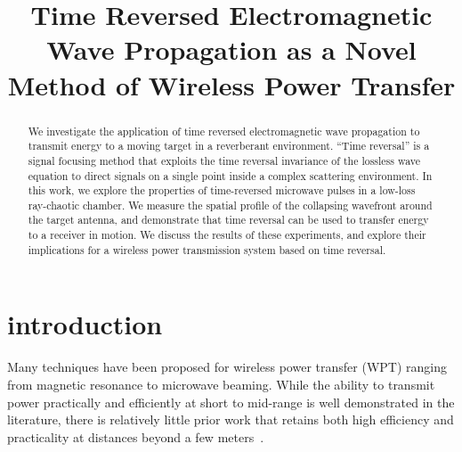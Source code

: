 \documentclass[conference]{IEEEtran}
\begin{document}
\title{\LARGE Time Reversed Electromagnetic Wave Propagation as a Novel Method of Wireless Power Transfer}

\author{
}

\maketitle

\begin{abstract}
We investigate the application of time reversed electromagnetic wave propagation
to transmit energy to a moving target in a reverberant environment.
%
``Time reversal'' is a signal focusing method that exploits the time reversal
invariance of the lossless wave equation to direct signals on a single point
inside a complex scattering environment.
%
In this work, we explore the properties of time-reversed microwave pulses in a
low-loss ray-chaotic chamber.
%
We measure the spatial profile of the collapsing wavefront around the target
antenna, and demonstrate that time reversal can be used to transfer energy to a
receiver in motion.
%
We discuss the results of these experiments, and explore their implications for
a wireless power transmission system based on time reversal.
\end{abstract}

\IEEEpeerreviewmaketitle

\section{introduction}
\label{sec:intro}

Many techniques have been proposed for wireless power transfer (WPT)
ranging from magnetic resonance to microwave beaming.
%
While the ability to transmit power practically and efficiently at short to
mid-range is well demonstrated in the literature, there is relatively little
prior work that retains both high efficiency and practicality at distances
beyond a few meters~\cite{wpt-progress}.
\end{document}
